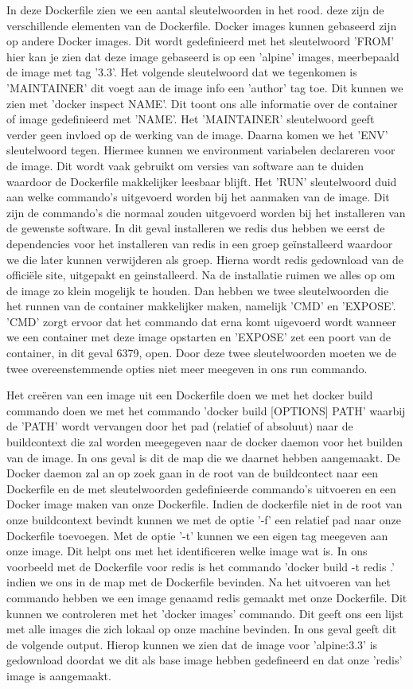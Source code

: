 In deze Dockerfile zien we een aantal sleutelwoorden in het rood. deze zijn de verschillende elementen van de Dockerfile. Docker images kunnen gebaseerd zijn op andere Docker images. Dit wordt gedefinieerd met het sleutelwoord 'FROM' hier kan je zien dat deze image gebaseerd is op een 'alpine' images, meerbepaald de image met tag '3.3'. Het volgende sleutelwoord dat we tegenkomen is 'MAINTAINER' dit voegt aan de image info een 'author' tag toe. Dit kunnen we zien met 'docker inspect NAME'. Dit toont ons alle informatie over de container of image gedefinieerd met 'NAME'. Het 'MAINTAINER' sleutelwoord geeft verder geen invloed op de werking van de image. Daarna komen we het 'ENV' sleutelwoord tegen. Hiermee kunnen we environment variabelen declareren voor de image. Dit wordt vaak gebruikt om versies van software aan te duiden waardoor de Dockerfile makkelijker leesbaar blijft. Het 'RUN' sleutelwoord duid aan welke commando's uitgevoerd worden bij het aanmaken van de image. Dit zijn de commando's die normaal zouden uitgevoerd worden bij het installeren van de gewenste software. In dit geval installeren we redis dus hebben we eerst de dependencies voor het installeren van redis in een groep geïnstalleerd waardoor we die later kunnen verwijderen als groep. Hierna wordt redis gedownload van de officiële site, uitgepakt en geinstalleerd. Na de installatie ruimen we alles op om de image zo klein mogelijk te houden. Dan hebben we twee sleutelwoorden die het runnen van de container makkelijker maken, namelijk 'CMD' en 'EXPOSE'. 'CMD' zorgt ervoor dat het commando dat erna komt uigevoerd wordt wanneer we een container met deze image opstarten en 'EXPOSE' zet een poort van de container, in dit geval 6379, open. Door deze twee sleutelwoorden moeten we de twee overeenstemmende opties niet meer meegeven in ons run commando.

Het creëren van een image uit een Dockerfile doen we met het docker build commando doen we met het commando 'docker build [OPTIONS] PATH' waarbij de 'PATH' wordt vervangen door het pad (relatief of absoluut) naar de buildcontext die zal worden meegegeven naar de docker daemon voor het builden van de image. In ons geval is dit de map die we daarnet hebben aangemaakt. De Docker daemon zal an op zoek gaan in de root van de buildcontect naar een Dockerfile en de met sleutelwoorden gedefinieerde commando's uitvoeren en een Docker image maken van onze Dockerfile. Indien de dockerfile niet in de root van onze buildcontext bevindt kunnen we met de optie '-f' een relatief pad naar onze Dockerfile toevoegen. Met de optie '-t' kunnen we een eigen tag meegeven aan onze image. Dit helpt ons met het identificeren welke image wat is. In ons voorbeeld met de Dockerfile voor redis is het commando 'docker build -t redis .' indien we ons in de map met de Dockerfile bevinden. Na het uitvoeren van het commando hebben we een image genaamd redis gemaakt met onze Dockerfile. Dit kunnen we controleren met het 'docker images' commando. Dit geeft ons een lijst met alle images die zich lokaal op onze machine bevinden. In ons geval geeft dit de volgende output. Hierop kunnen we zien dat de image voor 'alpine:3.3' is gedownload doordat we dit als base image hebben gedefineerd en dat onze 'redis' image is aangemaakt.


